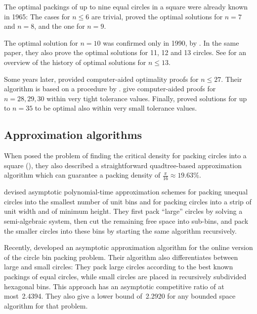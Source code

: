 \documentclass[a4paper,style=print,bibliography=totoc,nexus,lnum,extramargin]{tubsbook}
\begin{document}
The optimal packings of up to nine equal circles in a square were already known in 1965: The cases for $n \le 6$ are trivial,
\textcite{schaer1965densest} proved the optimal solutions for $n = 7$ and $n = 8$, and \textcite{SM1965geometric} the one for $n = 9$.

The optimal solution for $n = 10$ was confirmed only in 1990, by \textcite{DPW1990optimal}. In the same paper, they also prove the optimal solutions for 11, 12 and 13 circles.
See \textcite{WMP1994history} for an overview of the history of optimal solutions for $n \le 13$.

Some years later, \textcite{NO1998more} provided computer-aided optimality proofs for $n \le 27$. Their algorithm is based on a procedure by \textcite{PWMD1992packing}.
\textcite{MC2005new} give computer-aided proofs for $n=28,29,30$ within very tight tolerance values.
Finally, \textcite{LR2002packing} proved solutions for up to $n=35$ to be optimal also within very small tolerance values.

\subsection{Approximation algorithms}

When \textcite{DFL2010circle} posed the problem of finding the critical density for packing circles into a square (), they also described a straightforward quadtree-based approximation algorithm which can guarantee a packing density of $\frac{\pi}{16} \approx 19.63\%$.

\textcite{MPSSW2014polynomial} devised asymptotic polynomial-time approximation schemes for packing unequal circles into the smallest number of unit bins and for packing circles into a strip of unit width and of minimum height. They first pack “large” circles by solving a semi-algebraic system, then cut the remaining free space into sub-bins, and pack the smaller circles into these bins by starting the same algorithm recursively.

Recently, \textcite{HMS2016bounded} developed an asymptotic approximation algorithm for the online version of the circle bin packing problem.
Their algorithm also differentiates between large and small circles: They pack large circles according to the best known packings of equal circles, while small circles are placed in recursively subdivided hexagonal bins. This approach has an asymptotic competitive ratio of at most~2.4394. They also give a lower bound of~2.2920 for any bounded space algorithm for that problem.
\end{document}
